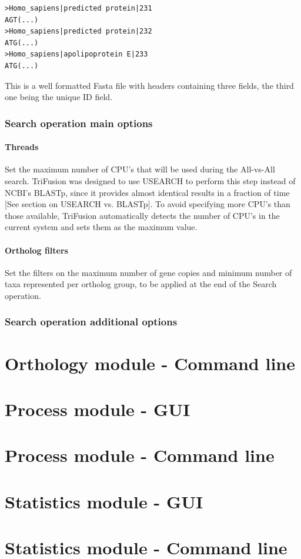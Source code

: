 \documentclass[12pt]{article}
\begin{document}
\begin{verbatim}
>Homo_sapiens|predicted protein|231
AGT(...)
>Homo_sapiens|predicted protein|232
ATG(...)
>Homo_sapiens|apolipoprotein E|233
ATG(...)
\end{verbatim}

This is a well formatted Fasta file with headers containing three fields, the third
one being the unique ID field.

\subsubsection{Search operation main options}

\paragraph{Threads}

Set the maximum number of CPU's that will be used during the All-vs-All search. TriFusion
was designed to use USEARCH to perform this step instead of NCBI's BLASTp, since it
provides almost identical results in a fraction of time [See section on USEARCH vs.
BLASTp]. To avoid specifying more CPU's than those available, TriFusion automatically
detects the number of CPU's in the current system and sets them as the maximum value.

\paragraph{Ortholog filters}

Set the filters on the maximum number of gene copies and minimum number of taxa
represented per ortholog group, to be applied at the end of the Search operation.


\subsubsection{Search operation additional options}



\section{Orthology module - Command line}

\section{Process module - GUI}

\section{Process module - Command line}

\section{Statistics module - GUI}

\section{Statistics module - Command line}





\end{document}

